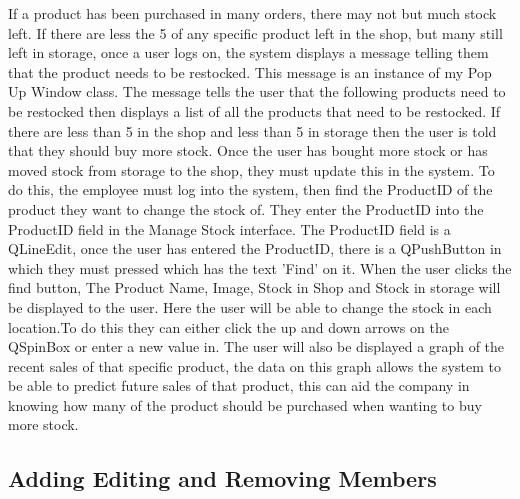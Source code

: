 If a product has been purchased in many orders, there may not but much stock left. If there are less the 5 of any specific product left in the shop, but many still left in storage, once a user logs on, the system displays a message telling them that the product needs to be restocked. This message is an instance of my Pop Up Window class. The message tells the user that the following products need to be restocked then displays a list of all the products that need to be restocked. If there are less than 5 in the shop and less than 5 in storage then the user is told that they should buy more stock. Once the user has bought more stock or has moved stock from storage to the shop, they must update this in the system. To do this, the employee must log into the system, then find the ProductID of the product they want to change the stock of. They enter the ProductID into the ProductID field in the Manage Stock interface. The ProductID field is a QLineEdit, once the user has entered the ProductID, there is a QPushButton in which they must pressed which has the text 'Find' on it. When the user clicks the find button, The Product Name, Image, Stock in Shop and Stock in storage will be displayed to the user. Here the user will be able to change the stock in each location.To do this they can either click the up and down arrows on the QSpinBox or enter a new value in. The user will also be displayed a graph of the recent sales of that specific product, the data on this graph allows the system to be able to predict future sales of that product, this can aid the company in knowing how many of the product should be purchased when wanting to buy more stock.

\subsection{Adding Editing and Removing Members}

